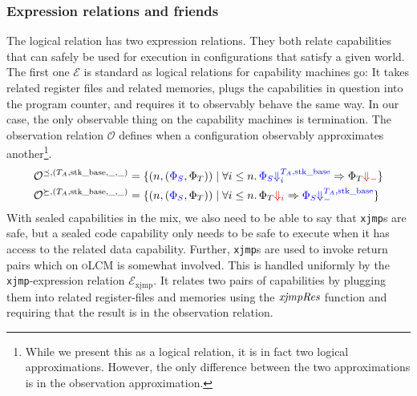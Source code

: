 \documentclass[acmsmall,review,anonymous]{acmart}\settopmatter{printfolios=true,printccs=false,printacmref=false}
\newcommand{\xjmpres}[1]{\plainfun{xjmpRes}{#1}}
\newcommand{\srccm}{\textsc{oLCM}}
\newcommand{\extend}[1]{}
\begin{document}
\subsubsection{Expression relations and friends}
The logical relation has two expression relations.
They both relate capabilities that can safely be used for execution in configurations that satisfy a given world.
The first one $\mathcal{E}$ is standard as logical relations for capability machines go: It takes related register files and related memories, plugs the capabilities in question into the program counter, and requires it to observably behave the same way.
In our case, the only observable thing on the capability machines is termination.
The observation relation $\mathcal{O}$ defines when a configuration observably approximates another\footnote{While we present this as a logical relation, it is in fact two logical approximations. However, the only difference between the two approximations is in the observation approximation.}.
\begin{align*}
  \lro[\preceq,(\ta,\stkb,\_,\_)] ={}&\{ \npair{\left(\src{\Phi_S},\Phi_T\right)} \mid
  \forall i \leq n \ldotp
    \src{\Phi_S \sterm[i]{\ta,\stkb}} \Rightarrow \Phi_T \trg{\term} \}\\
  \lro[\succeq,(\ta,\stkb,\_,\_)] ={}& \{ \npair{\left(\src{\Phi_S},\Phi_T\right)} \mid
  \forall i \leq n \ldotp 
    \Phi_T \trg{\term[i]} \Rightarrow \src{\Phi_S \sterm{\ta,\stkb}} \}
\end{align*}
With sealed capabilities in the mix, we also need to be able to say that \texttt{xjmp}s are safe, but a sealed code capability only needs to be safe to execute when it has access to the related data capability.
Further, \texttt{xjmp}s are used to invoke return pairs which on \srccm{} is somewhat involved.
This is handled uniformly by the \texttt{xjmp}-expression relation $\mathcal{E}_{\mathrm{xjmp}}$.
It relates two pairs of capabilities by plugging them into related register-files and memories using the $\xjmpres{}$ function and requiring that the result is in the observation relation.
\extend{Write that it is untrusted register files + intuition for this}
\end{document}
